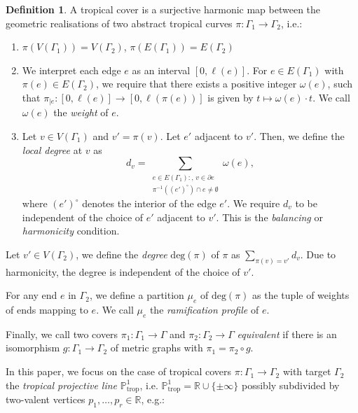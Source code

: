 \documentclass[10pt,a4paper,oneside,no-math,reqno]{amsart}%
\theoremstyle{plain}
\theoremstyle{definition}
\newtheorem{definition}[theorem]{Definition}
\theoremstyle{remark}
\numberwithin{equation}{section}
\newcommand{\1}{\mathds{1}}
\newcommand{\<}{\langle}
\renewcommand{\>}{\rangle}
\begin{document}
\begin{definition}
\label{def:tropcov}
    A tropical cover is a surjective harmonic map between the geometric realisations of two abstract tropical curves $\pi\colon\Gamma_1\to\Gamma_2$, i.e.:
    \begin{enumerate}
        \item $\pi(V(\Gamma_1))=V(\Gamma_2)$, $\pi(E(\Gamma_1))=E(\Gamma_2)$
        \item We interpret each edge $e$ as an interval $[0,\ell(e)]$. For $e\in E(\Gamma_1)$ with $\pi(e)\in E(\Gamma_2)$, we require that there exists a positive integer $\omega(e)$, such that $\pi_{|e}\colon [0,\ell(e)]\to[0,\ell(\pi(e))]$ is given by $t\mapsto \omega(e)\cdot t$. We call $\omega(e)$ the \emph{weight} of $e$.
        \item Let $v\in V(\Gamma_1)$ and $v'=\pi(v)$. Let $e'$ adjacent to $v'$. Then, we define the \emph{local degree} at $v$ as
        \begin{equation}
            d_v=\sum_{\substack{e\in E(\Gamma_1)\colon,\, v\in\partial e\\\pi^{-1}((e')^\circ)\cap e\neq\emptyset}}\omega(e),
        \end{equation}
        where $(e')^\circ$ denotes the interior of the edge $e'$. We require $d_v$ to be independent of the choice of $e'$ adjacent to $v'$. This is the \emph{balancing} or \emph{harmonicity} condition.
    \end{enumerate}

  Let $v'\in V(\Gamma_2)$, we define the \emph{degree} $\mathrm{deg}(\pi)$ of $\pi$ as $\sum_{\pi(v)=v'}d_v$. Due to harmonicity, the degree is independent of the choice of $v'$.

  For any end $e$ in $\Gamma_2$, we define a partition $\mu_e$ of $\mathrm{deg}(\pi)$ as the tuple of weights of ends mapping to $e$. We call $\mu_e$ the \emph{ramification profile} of $e$.

  Finally, we call two covers $\pi_1\colon \Gamma_1\to\Gamma$ and $\pi_2\colon\Gamma_2\to\Gamma$ \emph{equivalent} if there is an isomorphism $g\colon\Gamma_1\to\Gamma_2$ of metric graphs with $\pi_1=\pi_2\circ g$.
\end{definition}

In this paper, we focus on the case of tropical covers $\pi\colon\Gamma_1 \to \Gamma_2$ with target $\Gamma_2$ the \emph{tropical projective line} $\mathbb{P}^1_{\textrm{trop}}$, i.e. $\mathbb{P}^1_{\textrm{trop}}=\mathbb{R}\cup\{\pm\infty\}$ possibly subdivided by two-valent vertices $p_1,\dots,p_r\in\mathbb{R}$, e.g.:\vspace{\baselineskip}
\end{document}

